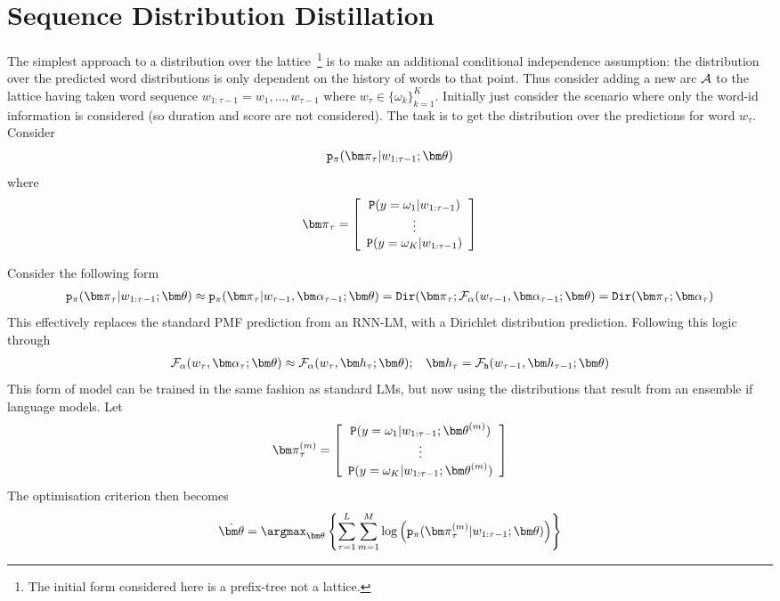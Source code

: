 \section{Sequence Distribution Distillation}
The simplest approach to a distribution over the lattice~\footnote{The initial form considered here is a prefix-tree not a lattice.} is to make an additional conditional independence assumption: the distribution over the predicted word distributions is only dependent on the history of words to that point. Thus consider adding a new arc ${\cal A}$ to the lattice having taken word sequence $w_{1:\tau-1}=w_1,\ldots,w_{\tau-1}$ where $w_\tau\in\{\omega_k\}_{k=1}^K$. Initially just consider the scenario where only the word-id information is  considered (so duration and score are not considered). The task is to get the distribution over the predictions for word $w_\tau$. Consider
\begin{eqnarray*}
{\tt p}_{\pi}({{\bm\pi}}_{\tau}|w_{1:\tau-1};{\bm\theta})
\end{eqnarray*}
where
\begin{eqnarray}
{\bm\pi}_{\tau} = \left[
\begin{array}{c}
{\tt P}(y=\omega_1|w_{1:\tau-1}) \\
\vdots\\
{\tt P}(y=\omega_K|w_{1:\tau-1}) 
\end{array}
\right]
\end{eqnarray}

Consider the following form
\begin{eqnarray}
{\tt p}_{\pi}({{\bm\pi}}_{\tau}|w_{1:\tau-1};{\bm\theta})
\approx
{\tt p}_{\pi}({{\bm\pi}}_{\tau}|w_{\tau-1},{\bm\alpha}_{\tau-1};{\bm\theta})
= {\tt Dir}({{\bm\pi}}_{\tau};{\cal F}_\alpha(w_{\tau-1},{\bm\alpha}_{\tau-1};{\bm\theta})
= {\tt Dir}({{\bm\pi}}_{\tau};{\bm\alpha}_{\tau})
\end{eqnarray}
This effectively replaces the standard PMF prediction from an RNN-LM, with a Dirichlet distribution prediction. Following this logic through
\begin{eqnarray}
{\cal F}_\alpha(w_{\tau},{\bm\alpha}_{\tau};{\bm\theta}) \approx
{\cal F}_\alpha(w_{\tau},{\bm h}_{\tau};{\bm\theta}); \:\:\:\:
{\bm h}_{\tau} = {\cal F}_{\tt h}(w_{\tau-1},{\bm h}_{\tau-1};{\bm\theta})
\end{eqnarray}
This form of model can be trained in the same fashion as standard LMs, but now using the distributions that result from an ensemble if language models. Let 
\begin{eqnarray}
{\bm\pi}^{(m)}_{\tau} = \left[
\begin{array}{c}
{\tt P}(y=\omega_1|w_{1:\tau-1};{\bm\theta}^{(m)}) \\
\vdots\\
{\tt P}(y=\omega_K|w_{1:\tau-1};{\bm\theta}^{(m)}) 
\end{array}
\right]
\end{eqnarray}
The optimisation criterion then becomes
\begin{eqnarray}
{\hat{\bm\theta}} = \argmax_{{\bm\theta}}\left\{
\sum_{\tau=1}^L\sum_{m=1}^M\log\left(
{\tt p}_{\pi}({\bm\pi}^{(m)}_{\tau}|w_{1:\tau-1};{\bm\theta})
\right)
\right\}
\end{eqnarray}

